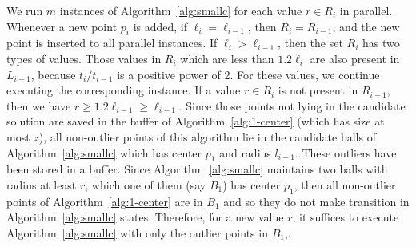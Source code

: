 \documentclass[envcountsame]{cls/cccg15}
\renewcommand{\O}{\ensuremath{{O}}}
\newcommand{\gee}{\geqslant}
\renewcommand{\ge}{\gee}
\newcommand{\eps}{\varepsilon}
\begin{document}
We run $m$ instances of Algorithm~\ref{alg:smallc} for each value $r \in R_i$ in parallel. 
Whenever a new point $p_i$ is added, 
if $\ell_i=\ell_{i-1}$, then $R_i = R_{i-1}$,
and the new point is inserted to all parallel instances. %
If $\ell_i > \ell_{i-1}$, then the set $R_i$ has two types of values.
Those values in $R_i$ which are less than $1.2\ell_i$ are also present in $L_{i-1}$,
because $t_i / t_{i-1}$ is a positive power of 2.
For these values, we continue executing the corresponding instance.
If a value $r \in R_i$ is not present in $R_{i-1}$, 
then we have $r \ge 1.2 \ell_{i - 1} \ge \ell_{i-1}$.
Since those points not lying in the candidate solution 
are saved in the buffer of Algorithm~\ref{alg:1-center} (which has size at most $z$), 
all non-outlier points of this algorithm lie in the candidate balls of Algorithm~\ref{alg:smallc} which has center $p_1$ and radius $l_{i-1}$. 
These outliers have been stored in a buffer. 
Since Algorithm~\ref{alg:smallc} maintains two balls with radius at least $r$, which one of them (say $B_1$) has center $p_1$, then all non-outlier points of Algorithm~\ref{alg:1-center} are in $B_1$ and so they do not make transition in Algorithm~\ref{alg:smallc} states.
Therefore, for a new value $r$, 
it suffices to execute Algorithm~\ref{alg:smallc} with only the outlier points in $B_1$,.

\end{document}
